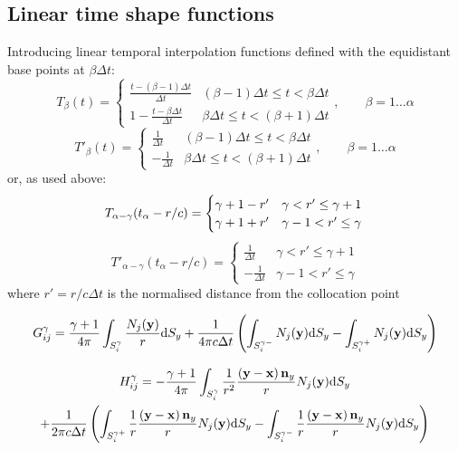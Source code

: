 \documentclass[a4paper,11pt,twoside]{article}
\newcommand{\td}{\mathrm{d}}
\begin{document}
\subsection{Linear time shape functions}

Introducing linear temporal interpolation functions defined with the equidistant base points at $\beta \Delta t$:
%
\begin{equation}
T_{\beta}(t) = \begin{cases}
\frac{t-(\beta-1)\Delta t}{\Delta t} & (\beta-1)\Delta t \le t < \beta \Delta t \\
1-\frac{t-\beta\Delta t}{\Delta t} & \beta\Delta t \le t < (\beta+1) \Delta t
\end{cases}, \qquad \beta = 1 \dots \alpha
\end{equation}
%
\begin{equation}
T'_{\beta}(t) = \begin{cases}
\frac{1}{\Delta t} & (\beta-1)\Delta t \le t < \beta \Delta t \\
-\frac{1}{\Delta t} & \beta\Delta t \le t < (\beta+1) \Delta t
\end{cases}, \qquad \beta = 1 \dots \alpha
\end{equation}
%
or, as used above:
%
\begin{equation}
T_{\alpha-\gamma}(t_{\alpha}-r/c)
= \begin{cases}
\gamma + 1 -r' & \gamma < r' \le \gamma+1 \\
\gamma + 1 +r' & \gamma-1 < r' \le \gamma
\end{cases} \nonumber \\
\end{equation}
%
\begin{equation}
T'_{\alpha-\gamma}(t_{\alpha}-r/c) = \begin{cases}
\frac{1}{\Delta t} & \gamma < r' \le \gamma+1 \\
-\frac{1}{\Delta t} & \gamma-1 < r' \le \gamma
\end{cases}
\end{equation}
%
where $r' = r/c\Delta t$ is the normalised distance from the collocation point


\begin{equation}
G_{ij}^{\gamma}
=
\frac{\gamma + 1}{4\pi}
\int_{S_i^{\gamma}}
\frac{N_j({\bf y})}{r}
\td S_{y}
+
\frac{1}{4\pi c \Delta t}
\left(
\int_{S_i^{\gamma-}}
N_j({\bf y})
\td S_{y}
-
\int_{S_i^{\gamma+}}
N_j({\bf y})
\td S_{y}
\right)
\end{equation}
%


\begin{multline}
H_{ij}^{\gamma}
=
-
\frac{\gamma+1}{4\pi}
\int_{S_{i}^{\gamma}}
\frac{1}{r^2}
\frac{\left({\bf y}-{\bf x}\right){\bf n}_y}{r}
N_j({\bf y})
\td S_{y}
\\ +
\frac{1}{2\pi c \Delta t}
\left(
\int_{S_{i}^{\gamma+}}
\frac{1}{r}
\frac{\left({\bf y}-{\bf x}\right){\bf n}_y}{r}
N_j({\bf y})
\td S_{y}
-
\int_{S_{i}^{\gamma-}}
\frac{1}{r}
\frac{\left({\bf y}-{\bf x}\right){\bf n}_y}{r}
N_j({\bf y})
\td S_{y}
\right)
\end{multline}
\end{document}

